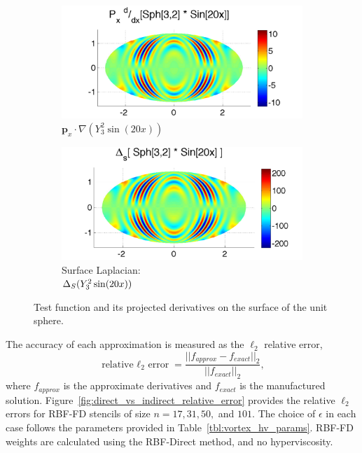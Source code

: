 \begin{figure}
\begin{center}
	\begin{subfigure}[t]{0.48\textwidth}
		\centering
	\includegraphics[width=1.0\textwidth]{../figures/appendices/direct_vs_indirect_weights/compare_weight_generation/xsfc_vs_xsfc_alt_on_sph32_times_sine_20x/pdx_sph32_times_sin20x-eps-converted-to.pdf}
	\caption{$\mathbf{p}_{x} \cdot \nabla ( Y_{3}^{2} \sin(20 x))$ }
			\label{fig:direct_vs_indirect_manufactured_xsfc}
	\end{subfigure}
	\begin{subfigure}[t]{0.48\textwidth}
		\centering
	\includegraphics[width=1.0\textwidth]{../figures/appendices/direct_vs_indirect_weights/compare_weight_generation/lsfc_vs_px_grad_dot_px_grad/lsfc_sph32_times_sin20x-eps-converted-to.pdf}
	\caption{Surface Laplacian: \\ $\Delta_S ( Y_{3}^{2} \sin(20 x) )$  }
				\label{fig:direct_vs_indirect_manufactured_lsfc}
	\end{subfigure}
	\caption{Test function and its projected derivatives on the surface of the unit sphere. }
				\label{fig:direct_vs_indirect_manufactured_solution}
	\end{center}
\end{figure}

The accuracy of each approximation is measured as the $\ell_2$ relative error,  
$$ \text{relative $\ell_{2}$ error} = \frac{|| f_{approx} - f_{exact} ||_{2} }{ || f_{exact} ||_{2} }, $$ 
where $f_{approx}$ is the approximate derivatives and $f_{exact}$ is the manufactured solution. Figure~\ref{fig:direct_vs_indirect_relative_error} provides the relative $\ell_{2}$ errors for RBF-FD stencils of size $n=17, 31, 50,$ and $101$. The choice of $\epsilon$ in each case follows the parameters provided in Table~\ref{tbl:vortex_hv_params}. RBF-FD weights are calculated using the RBF-Direct method, and no hyperviscosity. 

